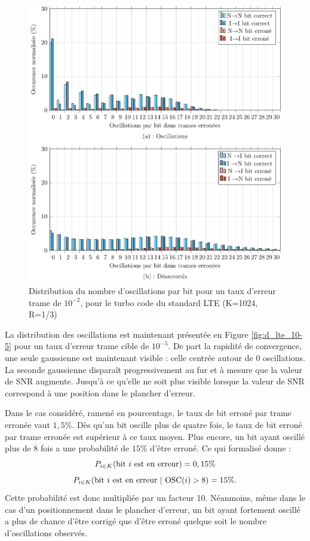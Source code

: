 \begin{figure}[!t]
	\centering
	\includegraphics[width=.8\textwidth]{main/ch2_fig/tikz/d_lte_10-2.pdf}
	\caption{Distribution du nombre d'oscillations par bit pour un taux d'erreur trame de $10^{-2}$, pour le turbo code du standard LTE (K=1024, R=1/3) \label{fig:d_lte_10-2}}
\end{figure}

La distribution des oscillations est maintenant présentée en Figure \ref{fig:d_lte_10-5} pour un  taux d'erreur trame 
cible de $10^{-5}$. De part la rapidité de convergence, une seule gaussienne est maintenant visible : celle centrée autour 
de 0 oscillations. 
La seconde gaussienne disparaît progressivement au fur et à mesure que la valeur de SNR augmente. Jusqu'à ce qu'elle ne 
soit plus visible lorsque la valeur de SNR correspond à une position dans le plancher d'erreur.

Dans le cas considéré, ramené en pourcentage, le taux de bit erroné par trame erronée vaut $1,5\%$. Dès qu'un bit oscille plus de quatre fois, 
le taux de bit erroné par trame erronée est supérieur à ce taux moyen. Plus encore, un bit ayant oscillé plus de 8 fois a une probabilité de $15\%$
d'être erroné. Ce qui formalisé donne :
\[P_{i \in K} (\textnormal{bit } i \textnormal{ est en erreur}) = 0,15 \%\]
\[P_{i \in K} (\textnormal{bit } i \textnormal{ est en erreur}\ |\ \textnormal{OSC}(i) > 8 ) = 15 \%.\]
Cette probabilité est donc multipliée par un facteur 10. Néanmoins, même dans le cas d'un positionnement 
dans le plancher d'erreur, un bit ayant fortement oscillé a plus de chance d'être corrigé que d'être erroné quelque soit le nombre
d'oscillations observés.

